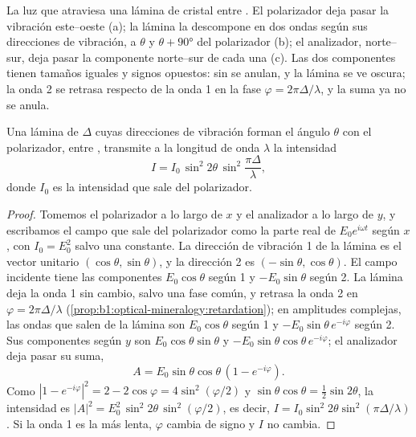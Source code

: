 \begin{omfigure}
{\small La luz que atraviesa una lámina de cristal entre . El polarizador deja pasar la vibración
este--oeste (a); la lámina la descompone en dos ondas según sus direcciones de vibración, a $\theta$ y
$\theta + \ang{90}$ del polarizador (b); el analizador, norte--sur, deja pasar la componente norte--sur de cada una
(c). Las dos componentes tienen tamaños iguales y signos opuestos: sin  se anulan, y la lámina se ve oscura;
la onda 2 se retrasa respecto de la onda 1 en la fase $\varphi = 2\pi\Delta/\lambda$, y la suma ya no se anula.}
\end{omfigure}

\begin{theorem}\label{thm:b1:optical-mineralogy:intensity}
Una lámina de  $\Delta$ cuyas direcciones de vibración forman el ángulo $\theta$ con el polarizador, entre
, transmite a la longitud de onda $\lambda$ la intensidad
\[
  I = I_0\,\sin^2 2\theta\,\sin^2\frac{\pi\Delta}{\lambda},
\]
donde $I_0$ es la intensidad que sale del polarizador.
\end{theorem}

\begin{proof}
Tomemos el polarizador a lo largo de $x$ y el analizador a lo largo de $y$, y escribamos el campo que sale del
polarizador como la parte real de $E_0 e^{i\omega t}$ según $x$, con $I_0 = E_0^2$ salvo una constante. La
dirección de vibración 1 de la lámina es el vector unitario $(\cos\theta, \sin\theta)$, y la dirección 2 es
$(-\sin\theta, \cos\theta)$. El campo incidente tiene las componentes $E_0\cos\theta$ según 1 y
$-E_0\sin\theta$ según 2. La lámina deja la onda 1 sin cambio, salvo una fase común, y retrasa la onda 2 en
$\varphi = 2\pi\Delta/\lambda$ (\cref{prop:b1:optical-mineralogy:retardation}); en amplitudes complejas, las
ondas que salen de la lámina son $E_0\cos\theta$ según 1 y $-E_0\sin\theta\,e^{-i\varphi}$ según 2. Sus
componentes según $y$ son $E_0\cos\theta\sin\theta$ y $-E_0\sin\theta\cos\theta\,e^{-i\varphi}$; el analizador
deja pasar su suma,
\[
  A = E_0\sin\theta\cos\theta\,(1 - e^{-i\varphi}) .
\]
Como $|1 - e^{-i\varphi}|^2 = 2 - 2\cos\varphi = 4\sin^2(\varphi/2)$ y $\sin\theta\cos\theta = \frac12\sin2\theta$,
la intensidad es $|A|^2 = E_0^2\,\sin^2 2\theta\,\sin^2(\varphi/2)$, es decir,
$I = I_0\sin^2 2\theta\sin^2(\pi\Delta/\lambda)$. Si la onda 1 es la más lenta, $\varphi$ cambia de signo y $I$ no
cambia.
\end{proof}

